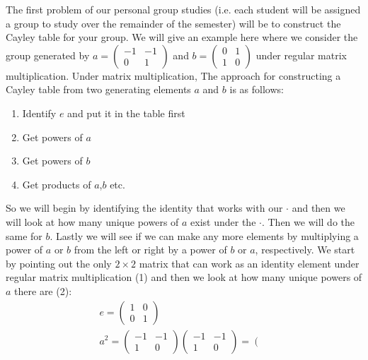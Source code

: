 \begin{example}
\label{ex:ConstructingFromGenerators}

\noindent The first problem of our personal group studies (i.e. each student will be assigned a group to study over the remainder of the semester) will be to construct the Cayley table for your group. We will give an example here where we consider the group generated by $a=\left(\begin{matrix}
-1 & -1 \\
0 & 1 
\end{matrix}\right)$ and $b=\left(\begin{matrix}
0 & 1 \\
1 & 0 
\end{matrix}\right)$ under regular matrix multiplication. Under matrix multiplication, 
The approach for constructing a Cayley table from two generating elements $a$ and $b$ is as follows:
\begin{enumerate}
    \item Identify $e$ and put it in the table first
    \item Get powers of $a$
    \item Get powers of $b$
    \item Get products of $a$,$b$ etc.
\end{enumerate}
So we will begin by identifying the identity that works with our $\cdot$ and then we will look at how many unique powers of $a$ exist under the $\cdot$. Then we will do the same for $b$. Lastly we will see if we can make any more elements by multiplying a power of $a$ or $b$ from the left or right by a power of $b$ or $a$, respectively. We start by pointing out the only $2\times 2$ matrix that can work as an identity element under regular matrix multiplication (1) and then we look at how many unique powers of $a$ there are (2):
\begin{align}
    e =\left(\begin{matrix}
1 & 0 \\
0 & 1 
\end{matrix}\right)\nonumber \\
a^2=\left(\begin{matrix}
-1 & -1 \\
1 & 0 
\end{matrix}\right)\left(\begin{matrix}
-1 & -1 \\
1 & 0 
\end{matrix}\right)=\left(\begin{matrix}

\end{matrix}
\end{align}
\end{example}
